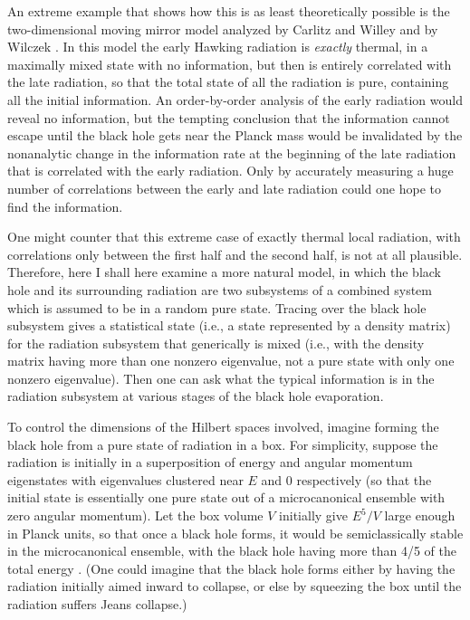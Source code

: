 	An extreme example that shows how this is as least
theoretically
possible is the two-dimensional moving mirror model analyzed by
Carlitz and Willey and by Wilczek \cite{CW2}.  In this model
the early Hawking radiation is {\it exactly} thermal, in a maximally
mixed
state with no information, but then is entirely correlated with the
late
radiation, so that the total state of all the radiation is pure,
containing
all the initial information.  An order-by-order analysis of the early
radiation would reveal no information, but the tempting conclusion
that
the information cannot escape until the black hole gets near the
Planck
mass would be invalidated by the nonanalytic change in the
information
rate at the beginning of the late radiation that is correlated with
the
early radiation.  Only by accurately measuring a huge number of
correlations between the early and late radiation could one hope
to find the information.

	One might counter that this extreme case of exactly thermal
local
radiation, with correlations only between the first half and the
second
half, is not at all plausible.  Therefore, here I shall here examine
a more
natural model, in which the black hole and its surrounding radiation
are two subsystems of a combined system which is assumed to be in
a random pure state.  Tracing over the black hole subsystem gives a
statistical state (i.e., a state represented by a density matrix) for
the
radiation subsystem that generically is mixed (i.e., with the density
matrix having more than one nonzero eigenvalue, not a pure state
with only one nonzero eigenvalue).  Then one can ask what the typical
information is in the radiation subsystem at various stages of the
black
hole evaporation.

	To control the dimensions of the Hilbert spaces involved,
imagine
forming the black hole from a pure state of radiation in a box.  For
simplicity, suppose the radiation is initially in a superposition of
energy
and angular momentum eigenstates with eigenvalues clustered near
$E$ and 0 respectively (so that the initial state is essentially one
pure
state out of a microcanonical ensemble with zero angular momentum).
Let the box volume $V$ initially give $E^5/V$ large enough in Planck
units,
so that once a black hole forms, it would be semiclassically stable
in the
microcanonical ensemble, with the black hole having more than 4/5 of
the total energy
\cite{Haw76a}.  (One could imagine that the black hole forms
either by having the radiation initially aimed inward to collapse, or
else
by squeezing the box until the radiation suffers Jeans collapse.)

